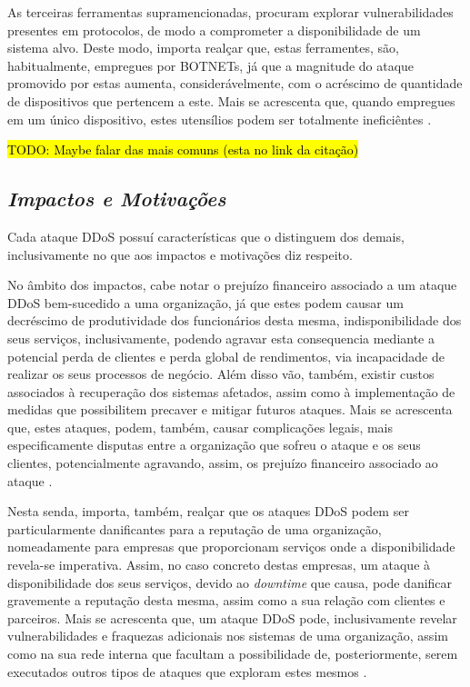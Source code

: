 As terceiras ferramentas supramencionadas, procuram explorar vulnerabilidades presentes em protocolos, de modo a comprometer a disponibilidade de um sistema alvo. Deste modo, importa realçar que, estas ferramentes, são, habitualmente, empregues por BOTNETs, já que a magnitude do ataque promovido por estas aumenta, considerávelmente, com o acréscimo de quantidade de dispositivos que pertencem a este. Mais se acrescenta que, quando empregues em um único dispositivo, estes utensílios podem ser totalmente ineficiêntes \cite{cloudflare_ddos_tools}.


\hl{TODO: Maybe falar das mais comuns (esta no link da citação)}

\subsection{\textit{Impactos e Motivações}}
Cada ataque DDoS possuí características que o distinguem dos demais, inclusivamente no que aos impactos e motivações diz respeito.


No âmbito dos impactos, cabe notar o prejuízo financeiro associado a um ataque DDoS bem-sucedido a uma organização, já que estes podem causar um decréscimo de produtividade dos funcionários desta mesma, indisponibilidade dos seus serviços, inclusivamente, podendo agravar esta consequencia mediante a potencial perda de clientes e perda global de rendimentos, via incapacidade de realizar os seus processos de negócio. Além disso vão, também, existir custos associados à recuperação dos sistemas afetados, assim como à implementação de medidas que possibilitem precaver e mitigar futuros ataques. Mais se acrescenta que, estes ataques, podem, também, causar complicações legais, mais especificamente disputas entre a organização que sofreu o ataque e os seus clientes, potencialmente agravando, assim, os prejuízo financeiro associado ao ataque \cite{connectwise_types_of_ddos_attacks,cybergc_defending_agaisnt_ddos,stormwall_impacts_ddos}.

Nesta senda, importa, também, realçar que os ataques DDoS podem ser particularmente danificantes para a reputação de uma organização, nomeadamente para empresas que proporcionam serviços onde a disponibilidade revela-se imperativa. Assim, no caso concreto destas empresas, um ataque à disponibilidade dos seus serviços, devido ao \textit{downtime} que causa, pode danificar gravemente a reputação desta mesma, assim como a sua relação com clientes e parceiros. Mais se acrescenta que, um ataque DDoS pode, inclusivamente revelar vulnerabilidades e fraquezas adicionais nos sistemas de uma organização, assim como na sua rede interna que facultam a possibilidade de, posteriormente, serem executados outros tipos de ataques que exploram estes mesmos \cite{connectwise_types_of_ddos_attacks,cybergc_defending_agaisnt_ddos,stormwall_impacts_ddos}.



